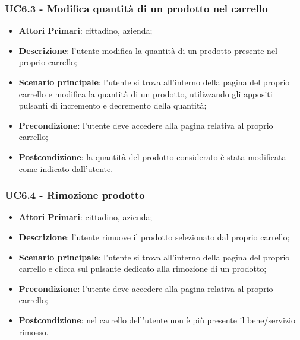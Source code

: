 \subsubsection{UC6.3 - Modifica quantità di un prodotto nel carrello}
\begin{itemize}
	\item \textbf{Attori Primari}: cittadino, azienda;
	\item \textbf{Descrizione}: l'utente modifica la quantità di un prodotto presente nel proprio carrello;
	\item \textbf{Scenario principale}: l'utente si trova all'interno della pagina del proprio carrello e modifica la quantità di un prodotto, utilizzando gli appositi pulsanti di incremento e decremento della quantità;
	\item \textbf{Precondizione}: l'utente deve accedere alla pagina relativa al proprio carrello;
	\item \textbf{Postcondizione}: la quantità del prodotto considerato è stata modificata come indicato dall'utente.
\end{itemize}

\subsubsection{UC6.4 - Rimozione prodotto}
\begin{itemize}
	\item \textbf{Attori Primari}: cittadino, azienda;
	\item \textbf{Descrizione}: l'utente rimuove il prodotto selezionato dal proprio carrello;
	\item \textbf{Scenario principale}: l'utente si trova all'interno della pagina del proprio carrello e clicca sul pulsante dedicato alla rimozione di un prodotto;
	\item \textbf{Precondizione}: l'utente deve accedere alla pagina relativa al proprio carrello;
	\item \textbf{Postcondizione}: nel carrello dell'utente non è più presente il bene/servizio rimosso.
\end{itemize}